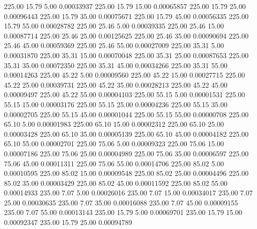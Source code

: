     225.00     15.79      5.00     0.00033937
    225.00     15.79     15.00     0.00065857
    225.00     15.79     25.00     0.00096443
    225.00     15.79     35.00     0.00075671
    225.00     15.79     45.00     0.00056335
    225.00     15.79     55.00     0.00028782
    225.00     25.46      5.00     0.00039335
    225.00     25.46     15.00     0.00087714
    225.00     25.46     25.00     0.00125625
    225.00     25.46     35.00     0.00090694
    225.00     25.46     45.00     0.00059369
    225.00     25.46     55.00     0.00027009
    225.00     35.31      5.00     0.00031870
    225.00     35.31     15.00     0.00070048
    225.00     35.31     25.00     0.00087653
    225.00     35.31     35.00     0.00072350
    225.00     35.31     45.00     0.00034266
    225.00     35.31     55.00     0.00014263
    225.00     45.22      5.00     0.00009560
    225.00     45.22     15.00     0.00027715
    225.00     45.22     25.00     0.00039731
    225.00     45.22     35.00     0.00028213
    225.00     45.22     45.00     0.00009497
    225.00     45.22     55.00     0.00004103
    225.00     55.15      5.00     0.00001531
    225.00     55.15     15.00     0.00003176
    225.00     55.15     25.00     0.00004236
    225.00     55.15     35.00     0.00002705
    225.00     55.15     45.00     0.00001044
    225.00     55.15     55.00     0.00000708
    225.00     65.10      5.00     0.00001983
    225.00     65.10     15.00     0.00002312
    225.00     65.10     25.00     0.00003428
    225.00     65.10     35.00     0.00005139
    225.00     65.10     45.00     0.00004182
    225.00     65.10     55.00     0.00002701
    225.00     75.06      5.00     0.00009323
    225.00     75.06     15.00     0.00007186
    225.00     75.06     25.00     0.00004989
    225.00     75.06     35.00     0.00006597
    225.00     75.06     45.00     0.00011311
    225.00     75.06     55.00     0.00014706
    225.00     85.02      5.00     0.00010595
    225.00     85.02     15.00     0.00009548
    225.00     85.02     25.00     0.00004496
    225.00     85.02     35.00     0.00003429
    225.00     85.02     45.00     0.00011592
    225.00     85.02     55.00     0.00014933
    235.00      7.07      5.00     0.00026016
    235.00      7.07     15.00     0.00034017
    235.00      7.07     25.00     0.00030635
    235.00      7.07     35.00     0.00016088
    235.00      7.07     45.00     0.00009155
    235.00      7.07     55.00     0.00013143
    235.00     15.79      5.00     0.00069701
    235.00     15.79     15.00     0.00092347
    235.00     15.79     25.00     0.00094789
